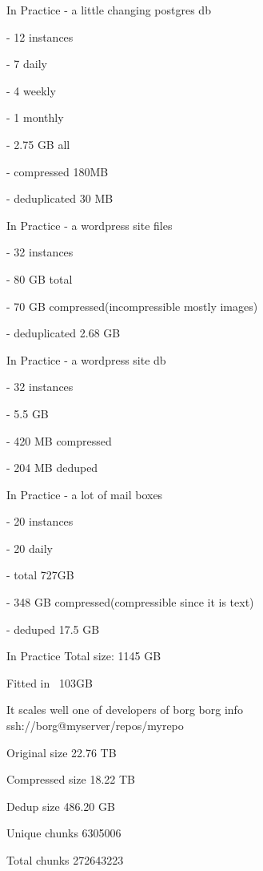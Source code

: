 \documentclass{beamer}
\begin{document}
\begin{frame}{In Practice}
	- a little changing postgres db 
	
	- 12 instances
	
	- 7 daily 
	
	- 4 weekly 
	
	- 1 monthly 
	
	- 2.75 GB all 
	
	- compressed 180MB
	
	- deduplicated 30 MB
\end{frame}

\begin{frame}{In Practice}
	- a wordpress site files  
	
	- 32 instances   
	
	- 80 GB total   
	
	- 70 GB compressed(incompressible mostly images)  
	
	- deduplicated 2.68 GB
	
\end{frame}

\begin{frame}{In Practice}
	- a wordpress site db
	
	- 32 instances
	
	- 5.5 GB
	
	- 420 MB compressed
	
	- 204 MB deduped
\end{frame}

\begin{frame}{In Practice}
	- a lot of mail boxes
	
	- 20 instances
	
	- 20 daily
	
	- total 727GB
	
	- 348 GB compressed(compressible since it is text)
	
	- deduped 17.5 GB
\end{frame}

\begin{frame}{In Practice}
	Total size: 1145 GB
	
	Fitted in ~103GB
\end{frame}

\begin{frame}{It scales well}
	one of developers of borg
	borg info ssh://borg@myserver/repos/myrepo
	
	Original size  22.76 TB
	
	 Compressed size 18.22 TB
	 
	   Dedup size 486.20 GB
	   
	Unique chunks 6305006
	
	         Total chunks                          272643223
\end{frame}
\end{document}
